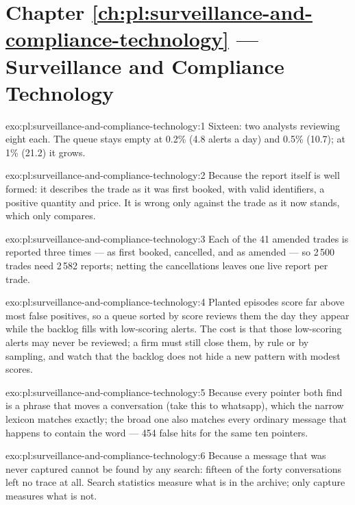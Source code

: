 \section*{Chapter \ref{ch:pl:surveillance-and-compliance-technology} --- Surveillance and Compliance Technology}

\begin{solution}{exo:pl:surveillance-and-compliance-technology:1}
Sixteen: two analysts reviewing eight each. The queue stays empty at 0.2\% (4.8 alerts a day) and 0.5\% (10.7); at 1\% (21.2) it grows.
\end{solution}

\begin{solution}{exo:pl:surveillance-and-compliance-technology:2}
Because the report itself is well formed: it describes the trade as it was first booked, with valid identifiers, a positive quantity and
price. It is wrong only against the trade as it now stands, which only  compares.
\end{solution}

\begin{solution}{exo:pl:surveillance-and-compliance-technology:3}
Each of the 41 amended trades is reported three times --- as first booked, cancelled, and as amended --- so 2\,500 trades need 2\,582 reports;
netting the cancellations leaves one live report per trade.
\end{solution}

\begin{solution}{exo:pl:surveillance-and-compliance-technology:4}
Planted episodes score far above most false positives, so a queue sorted by score reviews them the day they appear while the backlog fills with
low-scoring alerts. The cost is that those low-scoring alerts may never be reviewed; a firm must still close them, by rule or by sampling,
and watch that the backlog does not hide a new pattern with modest scores.
\end{solution}

\begin{solution}{exo:pl:surveillance-and-compliance-technology:5}
Because every pointer both find is a phrase that moves a conversation (\textquotedbl{}take this to whatsapp\textquotedbl{}), which the narrow
lexicon matches exactly; the broad one also matches every ordinary message that happens to contain the word --- 454 false hits for the same
ten pointers.
\end{solution}

\begin{solution}{exo:pl:surveillance-and-compliance-technology:6}
Because a message that was never captured cannot be found by any search: fifteen of the forty conversations left no trace at all. Search
statistics measure what is in the archive; only capture measures what is not.
\end{solution}

